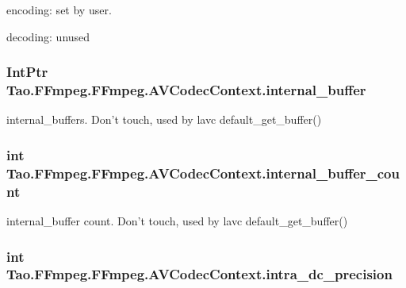 \begin{DoxyItemize}
\item encoding: set by user.
\item decoding: unused 
\end{DoxyItemize}\hypertarget{struct_tao_1_1_f_fmpeg_1_1_f_fmpeg_1_1_a_v_codec_context_ab0a03be1649f55e32eca5ac1b47828bc}{
\subsubsection[{internal\_\-buffer}]{\setlength{\rightskip}{0pt plus 5cm}IntPtr {\bf Tao.FFmpeg.FFmpeg.AVCodecContext.internal\_\-buffer}}}
\label{struct_tao_1_1_f_fmpeg_1_1_f_fmpeg_1_1_a_v_codec_context_ab0a03be1649f55e32eca5ac1b47828bc}
internal\_\-buffers. Don't touch, used by lavc default\_\-get\_\-buffer() \hypertarget{struct_tao_1_1_f_fmpeg_1_1_f_fmpeg_1_1_a_v_codec_context_a80a086433847e01a319aa7d648830538}{
\subsubsection[{internal\_\-buffer\_\-count}]{\setlength{\rightskip}{0pt plus 5cm}int {\bf Tao.FFmpeg.FFmpeg.AVCodecContext.internal\_\-buffer\_\-count}}}
\label{struct_tao_1_1_f_fmpeg_1_1_f_fmpeg_1_1_a_v_codec_context_a80a086433847e01a319aa7d648830538}
internal\_\-buffer count. Don't touch, used by lavc default\_\-get\_\-buffer() \hypertarget{struct_tao_1_1_f_fmpeg_1_1_f_fmpeg_1_1_a_v_codec_context_aac12774efc670bf0d1983e8858ac0fc3}{
\subsubsection[{intra\_\-dc\_\-precision}]{\setlength{\rightskip}{0pt plus 5cm}int {\bf Tao.FFmpeg.FFmpeg.AVCodecContext.intra\_\-dc\_\-precision}}}
